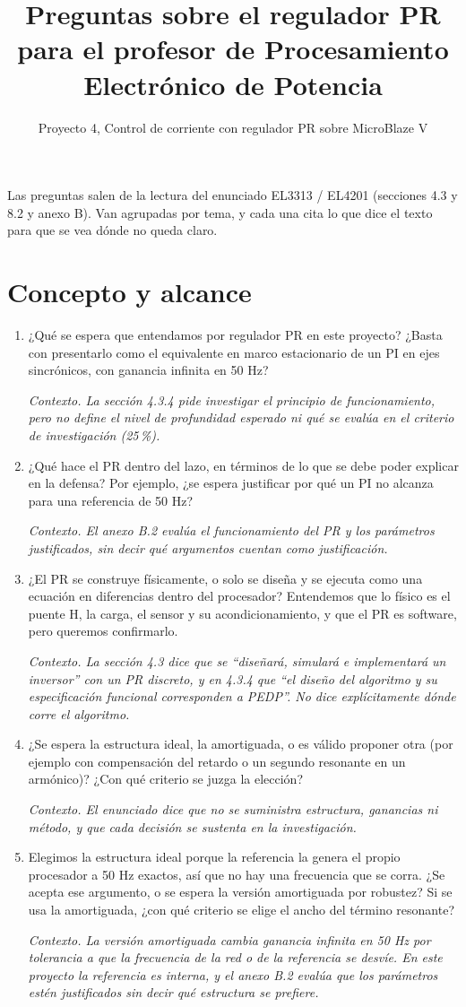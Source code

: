 \documentclass[11pt,a4paper]{article}
\title{Preguntas sobre el regulador PR para el profesor de Procesamiento Electrónico de Potencia}
\author{Proyecto 4, Control de corriente con regulador PR sobre MicroBlaze V}
\date{}
\newcommand{\ctx}[1]{\par\vspace{0.2em}\small\textit{Contexto. #1}\normalsize}
\begin{document}
\maketitle

Las preguntas salen de la lectura del enunciado EL3313 / EL4201 (secciones 4.3 y 8.2 y anexo B). Van agrupadas por tema, y cada una cita lo que dice el texto para que se vea dónde no queda claro.

\section{Concepto y alcance}

\begin{enumerate}
  \item ¿Qué se espera que entendamos por regulador PR en este proyecto? ¿Basta con presentarlo como el equivalente en marco estacionario de un PI en ejes sincrónicos, con ganancia infinita en 50 Hz?
  \ctx{La sección 4.3.4 pide investigar el principio de funcionamiento, pero no define el nivel de profundidad esperado ni qué se evalúa en el criterio de investigación (25\,\%).}

  \item ¿Qué hace el PR dentro del lazo, en términos de lo que se debe poder explicar en la defensa? Por ejemplo, ¿se espera justificar por qué un PI no alcanza para una referencia de 50 Hz?
  \ctx{El anexo B.2 evalúa el funcionamiento del PR y los parámetros justificados, sin decir qué argumentos cuentan como justificación.}

  \item ¿El PR se construye físicamente, o solo se diseña y se ejecuta como una ecuación en diferencias dentro del procesador? Entendemos que lo físico es el puente H, la carga, el sensor y su acondicionamiento, y que el PR es software, pero queremos confirmarlo.
  \ctx{La sección 4.3 dice que se ``diseñará, simulará e implementará un inversor'' con un PR discreto, y en 4.3.4 que ``el diseño del algoritmo y su especificación funcional corresponden a PEDP''. No dice explícitamente dónde corre el algoritmo.}

  \item ¿Se espera la estructura ideal, la amortiguada, o es válido proponer otra (por ejemplo con compensación del retardo o un segundo resonante en un armónico)? ¿Con qué criterio se juzga la elección?
  \ctx{El enunciado dice que no se suministra estructura, ganancias ni método, y que cada decisión se sustenta en la investigación.}

  \item Elegimos la estructura ideal porque la referencia la genera el propio procesador a 50 Hz exactos, así que no hay una frecuencia que se corra. ¿Se acepta ese argumento, o se espera la versión amortiguada por robustez? Si se usa la amortiguada, ¿con qué criterio se elige el ancho del término resonante?
  \ctx{La versión amortiguada cambia ganancia infinita en 50 Hz por tolerancia a que la frecuencia de la red o de la referencia se desvíe. En este proyecto la referencia es interna, y el anexo B.2 evalúa que los parámetros estén justificados sin decir qué estructura se prefiere.}
\end{enumerate}
\end{document}
